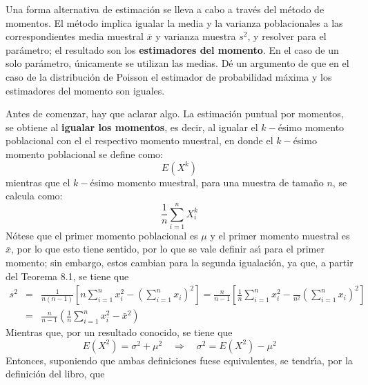 \begin{enunciado}
 Una forma alternativa de estimaci\'on se lleva a cabo a trav\'es del m\'etodo de momentos. El m\'etodo implica igualar la media y la varianza poblacionales a las correspondientes media muestral $\bar{x}$ y varianza muestra $s^2$, y resolver para el par\'ametro; el resultado son los \textbf{estimadores del momento}. En el caso de un solo par\'ametro, \'unicamente se utilizan las medias. D\'e un argumento de que en el caso de la distribuci\'on de Poisson el estimador de probabilidad m\'axima y los estimadores del momento son iguales.
\end{enunciado}

\begin{solucion}
 Antes de comenzar, hay que aclarar algo. La estimaci\'on puntual por momentos, se obtiene al \textbf{igualar los momentos}, es decir, al igualar el $k-$\'esimo momento poblacional con el el respectivo momento muestral, en donde el $k-$\'esimo momento poblacional se define como:
 \begin{equation*}
  E\left( X^k \right)
 \end{equation*}
 mientras que el $k-$\'esimo momento muestral, para una muestra de tama\~no $n$, se calcula como:
 \begin{equation*}
  \frac{1}{n} \sum_{i=1}^{n} X_i^k
 \end{equation*}
 N\'otese que el primer momento poblacional es $\mu$ y el primer momento muestral es $\bar{x}$, por lo que esto tiene sentido, por lo que se vale definir as\'{\i} para el primer momento; sin embargo, estos cambian para la segunda igualaci\'on, ya que, a partir del Teorema 8.1, se tiene que
 \begin{eqnarray*}
  s^2 & = & \frac{1}{n(n-1)}\left[ n\sum_{i=1}^n x_i^2 - \left( \sum_{i=1}^n x_i \right)^2 \right] = \frac{n}{n-1}\left[ \frac{1}{n} \sum_{i=1}^n x_i^2 - \frac{}{n^2}\left( \sum_{i=1}^n x_i \right)^2 \right] \\
  & = & \frac{n}{n-1} \left( \frac{1}{n} \sum_{i=1}^n x_i^2 - \bar{x}^2  \right)
 \end{eqnarray*}
 Mientras que, por un resultado conocido, se tiene que 
 \begin{equation*}
  E\left( X^2 \right) = \sigma^2 + \mu^2 \quad \Rightarrow \quad \sigma^2 = E\left( X^2 \right) - \mu^2
 \end{equation*}
 Entonces, suponiendo que ambas definiciones fuese equivalentes, se tendr\'{\i}a, por la definici\'on del libro, que
 \begin{equation*}

\end{equation*}
\end{solucion}
